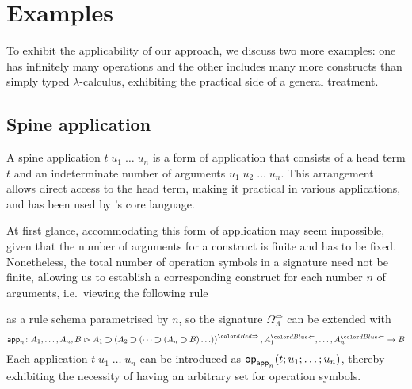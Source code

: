 
\section{Examples}\label{sec:example}
To exhibit the applicability of our approach, we discuss two more examples:
one has infinitely many operations and the other includes many more constructs than simply typed $\lambda$-calculus, exhibiting the practical side of a general treatment.

\subsection{Spine application}\label{subsec:spine}
A spine application $t\;u_1\;\ldots\;u_n$ is a form of application that consists of a head term $t$ and an indeterminate number of arguments $u_1\;u_2\;\dots\;u_n$.
This arrangement allows direct access to the head term, making it practical in various applications, and has been used by \Agda's core language. %

At first glance, accommodating this form of application may seem impossible, given that the number of arguments for a construct is finite and has to be fixed.
Nonetheless, the total number of operation symbols in a signature need not be finite, allowing us to establish a corresponding construct for each number $n$ of arguments, i.e.\ viewing the following rule
\bgroup
\small
  \begin{mathpar}
  \end{mathpar}
\egroup
as a rule schema parametrised by $n$, so the signature $\Omega_{\Lambda}^{\Leftrightarrow}$ can be extended with 
\[
  \aritysymbol{\mathsf{app}_n}{A_1,\ldots, A_n, B}{A_1 \bto \left(A_2 \bto \left(\dots \bto \left(A_n \bto B\right)\ldots\right)\right)^{\syn}, A_1^{\chk}, \ldots, A_n^{\chk}}{B}
\]
Each application $t\;u_1\;\ldots\;u_n$ can be introduced as $\tmOp_{\mathsf{app}_n}(t; u_1; \ldots; u_n)$, thereby exhibiting the necessity of having an arbitrary set for operation symbols.


